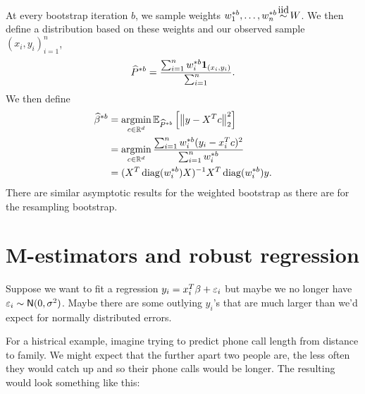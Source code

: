 At every bootstrap iteration $b$, we sample weights $w_1^{*b},\ldots, w_n^{*b} \iid W$. We then define a distribution based on these weights and our observed sample $(x_i,y_i)_{i=1}^n$, 
\[\widehat{P}^{*b} =\frac{\sum_{i=1}^n w_i^{*b}{{\bf 1}}_{(x_i,y_i)}}{\sum_{i=1}^n}. \]
We then define 
\begin{align*}
    \widehat{\beta}^{*b} &=\operatorname*{argmin}_{c \in {\mathbb R}^d}{\mathbb{E}}_{\widehat{P}^{*b}}\left[\left\|y-X^Tc\right\|_2^2\right]\\
    &=\operatorname*{argmin}_{c \in {\mathbb R}^d} \frac{\sum_{i=1}^n w_i^{*b}(y_i-x_i^Tc)^2}{\sum_{i=1}^n w_i^{*b}}\\
    &= (X^T\operatorname*{diag}(w_i^{*b})X)^{-1}X^T\operatorname*{diag}(w_i^{*b})y.
\end{align*} 
There are similar asymptotic results for the weighted bootstrap as there are for the resampling bootstrap.
\section{M-estimators and robust regression}
Suppose we want to fit a regression $y_i = x_i^T\beta +\varepsilon_i$ but maybe we no longer have $\varepsilon_i \sim {\mathsf{N}}(0,\sigma^2)$. Maybe there are some outlying $y_i$'s that are much larger than we'd expect for normally distributed errors.

For a histrical example, imagine trying to predict phone call length from distance to family. We might expect that the further apart two people are, the less often they would catch up and so their phone calls would be longer. The resulting would look something like this:

